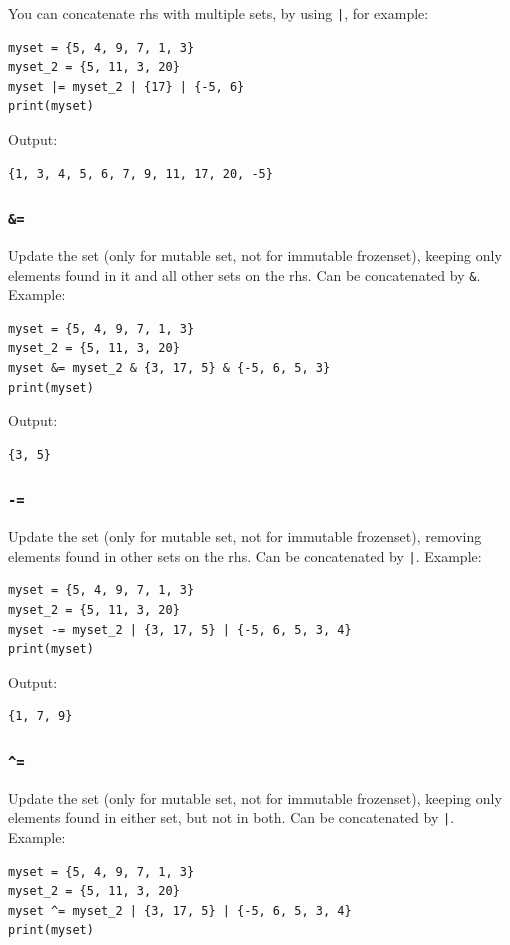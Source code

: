 \documentclass[12pt]{book}
\begin{document}
You can concatenate rhs with multiple sets, by using \texttt{|}, for example:
\begin{verbatim}
myset = {5, 4, 9, 7, 1, 3}
myset_2 = {5, 11, 3, 20}
myset |= myset_2 | {17} | {-5, 6}
print(myset)
\end{verbatim}
Output:
\begin{verbatim}
{1, 3, 4, 5, 6, 7, 9, 11, 17, 20, -5}
\end{verbatim}

\subsubsection{\texttt{\&=}}
\label{sec:orgd0da3c4}
Update the set (only for mutable set, not for immutable frozenset), keeping only elements found in it and all other sets on the rhs. Can be concatenated by \texttt{\&}. Example:
\begin{verbatim}
myset = {5, 4, 9, 7, 1, 3}
myset_2 = {5, 11, 3, 20}
myset &= myset_2 & {3, 17, 5} & {-5, 6, 5, 3}
print(myset)
\end{verbatim}
Output:
\begin{verbatim}
{3, 5}
\end{verbatim}

\subsubsection{\texttt{-=}}
\label{sec:org43fbac5}
Update the set (only for mutable set, not for immutable frozenset), removing elements found in other sets on the rhs. Can be concatenated by \texttt{|}. Example:
\begin{verbatim}
myset = {5, 4, 9, 7, 1, 3}
myset_2 = {5, 11, 3, 20}
myset -= myset_2 | {3, 17, 5} | {-5, 6, 5, 3, 4}
print(myset)
\end{verbatim}
Output:
\begin{verbatim}
{1, 7, 9}
\end{verbatim}

\subsubsection{\texttt{\textasciicircum{}=}}
\label{sec:org49247d3}
Update the set (only for mutable set, not for immutable frozenset), keeping only elements found in either set, but not in both. Can be concatenated by \texttt{|}. Example:
\begin{verbatim}
myset = {5, 4, 9, 7, 1, 3}
myset_2 = {5, 11, 3, 20}
myset ^= myset_2 | {3, 17, 5} | {-5, 6, 5, 3, 4}
print(myset)
\end{verbatim}
\end{document}
